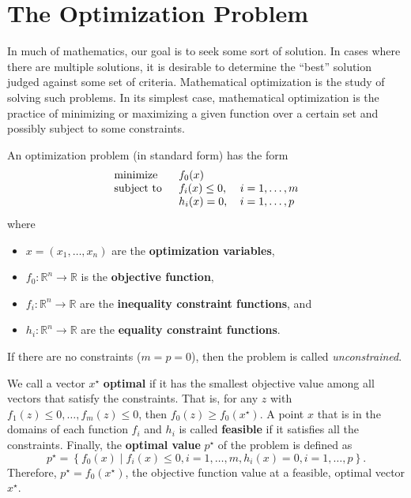 \section{The Optimization Problem}

In much of mathematics, our goal is to seek some sort of solution. In cases where there are multiple solutions, it is desirable to determine the ``best'' solution judged against some set of criteria. Mathematical optimization is the study of solving such problems. In its simplest case, mathematical optimization is the practice of minimizing or maximizing a given function over a certain set and possibly subject to some constraints.

\begin{defn}
An {\color{tiananmen}optimization problem} (in standard form) has the form
\begin{equation}
	\begin{tabular}{lll}
		\text{minimize }   & $f_0(x)$          & \\
		\text{subject to } & $f_i(x)\leq 0$, & $i=1,\ldots, m$\\
		& $h_i(x) = 0$,      & $i=1,\ldots, p$
	\end{tabular}\label{Optimization}
\end{equation}
where
\begin{itemize}
	\item {\color{baystate} $x=\left(x_1,\ldots,x_n\right)$} are the {\color{tiananmen} \textbf{optimization variables}},
	\item {\color{baystate} $f_0 : \mathbb{R}^n\rightarrow\mathbb{R}$} is the {\color{tiananmen} \textbf{objective function}},
	\item {\color{baystate} $f_i : \mathbb{R}^n\rightarrow\mathbb{R}$} are the {\color{tiananmen} \textbf{inequality constraint functions}}, and
	\item {\color{baystate} $h_i : \mathbb{R}^n\rightarrow\mathbb{R}$} are the {\color{tiananmen}\textbf{equality constraint functions}}.
\end{itemize}
\end{defn}
If there are no constraints ($m=p=0$), then the problem is called {\color{tiananmen}\textit{unconstrained}}. \cite[p. 127]{Boyd2004}

We call a vector {\color{baystate} $x^\star$} {\color{tiananmen} \textbf{optimal}} if it has the smallest objective value among all vectors that satisfy the constraints. That is, for any $z$ with $f_1(z)\leq 0,\ldots, f_m(z)\leq 0$, then $f_0(z)\geq f_0(x^\star)$. A point $x$ that is in the domains of each function $f_i$ and $h_i$ is called {\color{tiananmen}\textbf{feasible}} if it satisfies all the constraints. Finally, the {\color{tiananmen} \textbf{optimal value}} {\color{baystate}$p^\star$} of the problem is defined as {\color{baystate}$$p^\star=\left\lbrace f_0(x) \mid f_i(x)\leq 0, i=1,\ldots,m, h_i(x)=0, i=1,\ldots,p\right\rbrace.$$} Therefore, $p^{\star}=f_0(x^\star)$, the objective function value at a feasible, optimal vector $x^{\star}$.

